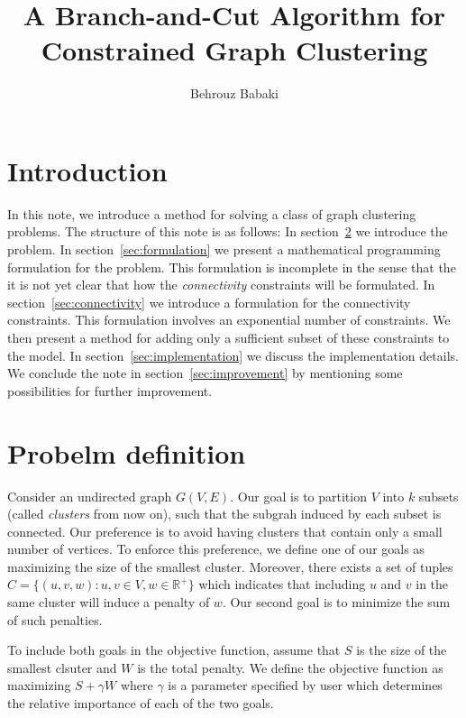 \documentclass[]{article}
\begin{document}
\title{A Branch-and-Cut Algorithm for Constrained Graph Clustering}
\author{Behrouz Babaki}
\date{}
\maketitle

\section{Introduction}
\label{introduction}

In this note, we introduce a method for solving a class of graph
clustering problems. The structure of this note is as follows: In
section~\ref{sec:definition} we introduce the problem. In
section~\ref{sec:formulation} we present a mathematical programming
formulation for the problem. This formulation is incomplete in the
sense that the it is not yet clear that how the \emph{connectivity}
constraints will be formulated. In section~\ref{sec:connectivity} we
introduce a formulation for the connectivity constraints. This
formulation involves an exponential number of constraints. We then
present a method for adding only a sufficient subset of these
constraints to the model. In section~\ref{sec:implementation} we
discuss the implementation details. We conclude the note in
section~\ref{sec:improvement} by mentioning some possibilities for
further improvement.

\section{Probelm definition}
\label{sec:definition}

Consider an undirected graph $G(V, E)$. Our goal is to partition $V$
into $k$ subsets (called \emph{clusters} from now on), such that the
subgrah induced by each subset is connected. Our preference is to avoid
having clusters that contain only a small number of vertices. To enforce
this preference, we define one of our goals as maximizing the size of
the smallest cluster. Moreover, there exists a set of tuples
$C = \{(u, v, w): u, v \in V, w \in \mathbb{R}^+\}$ which indicates that
including $u$ and $v$ in the same cluster will induce a penalty of $w$.
Our second goal is to minimize the sum of such penalties.

To include both goals in the objective function, assume that $S$ is the
size of the smallest clsuter and $W$ is the total penalty. We define the
objective function as maximizing $S + \gamma W$ where $\gamma$ is a
parameter specified by user which determines the relative importance of
each of the two goals.
\end{document}
